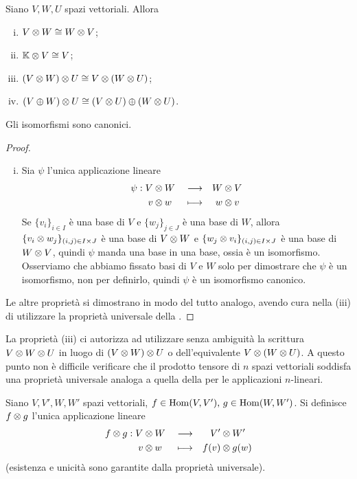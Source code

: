 \begin{proposition}
Siano $V\comma W\comma U$ spazi vettoriali. Allora
\begin{enumerate}[(i)]
\item $V\otimes W\cong W\otimes V$;
\item $\mathbb{K}\otimes V\cong V$;
\item $(V\otimes W)\otimes U\cong V\otimes(W\otimes U)$;
\item $(V\oplus W)\otimes U\cong(V\otimes U)\oplus(W\otimes U)$.
\end{enumerate}
Gli isomorfismi sono canonici.
\end{proposition}
\begin{proof}\leavevmode
\begin{enumerate}[(i)]
\item Sia $\psi$ l'unica applicazione lineare
\begin{alignat*}{3}
\psi:V&\otimes W&&\longrightarrow &W&\otimes V\\
v&\otimes w&&\longmapsto&w&\otimes v
\end{alignat*}
Se $\{v_i\}_{i\in I}$ è una base di $V$ e $\{w_j\}_{j\in J}$ è una base di $W$, allora $\{v_i\otimes w_j\}_{(i,j)\in I\times J}$ è una base di $V\otimes W$ e $\{w_j\otimes v_i\}_{(i,j)\in I\times J}$ è una base di $W\otimes V$, quindi $\psi$ manda una base in una base, ossia è un isomorfismo. Osserviamo che abbiamo fissato basi di $V$ e $W$ solo per dimostrare che $\psi$ è un isomorfismo, non per definirlo, quindi $\psi$ è un isomorfismo canonico.
\end{enumerate}
Le altre proprietà si dimostrano in modo del tutto analogo, avendo cura nella (iii) di utilizzare la proprietà universale della .
\end{proof}

La proprietà (iii) ci autorizza ad utilizzare senza ambiguità la scrittura $V\otimes W\otimes U$ in luogo di $(V\otimes W)\otimes U$ o dell'equivalente $V\otimes(W\otimes U)$. A questo punto non è difficile verificare che il prodotto tensore di $n$ spazi vettoriali soddisfa una proprietà universale analoga a quella della  per le applicazioni $n$-lineari.

\begin{definition}
Siano $V\comma V'\comma W\comma W'$ spazi vettoriali, $f\in\operatorname{Hom}(V,V'),\,\allowbreak g\in\operatorname{Hom}(W,W')$. Si definisce $f\otimes g$ l'unica applicazione lineare
\begin{alignat*}{3}
f\otimes g:V&\otimes W&&\longrightarrow &V'&\otimes W'\\
v&\otimes w&&\longmapsto &f(v)&\otimes g(w)
\end{alignat*}
(esistenza e unicità sono garantite dalla proprietà universale).
\end{definition}

